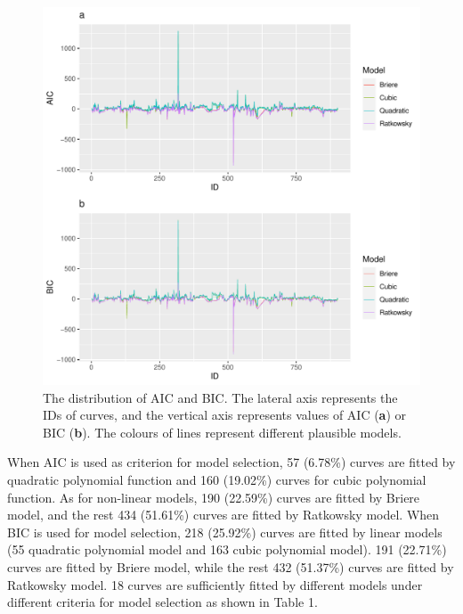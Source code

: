 \documentclass[11pt]{article}
\begin{document}
    \begin{figure}[H]
      \centering
      \includegraphics[width=\textwidth]{../Results/a.pdf}
      \caption{The distribution of AIC and BIC. The lateral axis represents the IDs of curves, and the vertical 
      axis represents values of AIC (\textbf{a}) or BIC (\textbf{b}). The colours of lines represent different 
      plausible models.}
    \end{figure}
    When AIC is used as criterion for model selection, 57 (6.78\%) curves are  
    fitted by quadratic polynomial function and 160 (19.02\%) curves for cubic polynomial function. As for non-linear 
    models, 190 (22.59\%) curves are fitted by Briere model, and the rest 434 (51.61\%) curves are fitted by Ratkowsky 
    model. When BIC is used for model selection, 218 (25.92\%) curves are fitted by linear models (55 quadratic 
    polynomial model and 163 cubic polynomial model). 191 (22.71\%) curves are fitted by Briere model, while the 
    rest 432 (51.37\%) curves are fitted by Ratkowsky model. 18 curves are sufficiently 
    fitted by different models under different criteria for model selection as shown in Table 1.
\end{document}
